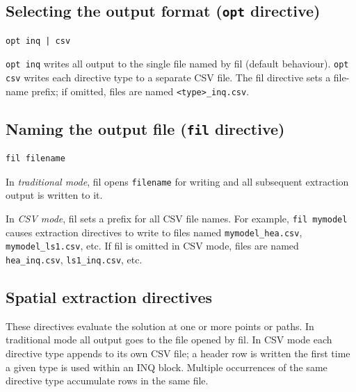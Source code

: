 \subsection{Selecting the output format (\texttt{opt} directive)}

\begin{verbatim}
opt inq | csv
\end{verbatim}

\texttt{opt inq} writes all output to the single file named by \textsf{fil} (default behaviour).
\texttt{opt csv} writes each directive type to a separate CSV file. The \textsf{fil} directive
sets a file-name prefix; if omitted, files are named \texttt{<type>\_inq.csv}.

\subsection{Naming the output file (\texttt{fil} directive)}

\begin{verbatim}
fil filename
\end{verbatim}

In \emph{traditional mode}, \textsf{fil} opens \texttt{filename} for writing and all subsequent
extraction output is written to it.

In \emph{CSV mode}, \textsf{fil} sets a prefix for all CSV file names. For example,
\texttt{fil mymodel} causes extraction directives to write to files named
\texttt{mymodel\_hea.csv}, \texttt{mymodel\_ls1.csv}, etc. If \textsf{fil} is omitted in CSV
mode, files are named \texttt{hea\_inq.csv}, \texttt{ls1\_inq.csv}, etc.

\subsection{Spatial extraction directives}

These directives evaluate the solution at one or more points or paths. In traditional mode all
output goes to the file opened by \textsf{fil}. In CSV mode each directive type appends to its
own CSV file; a header row is written the first time a given type is used within an INQ block.
Multiple occurrences of the same directive type accumulate rows in the same file.

